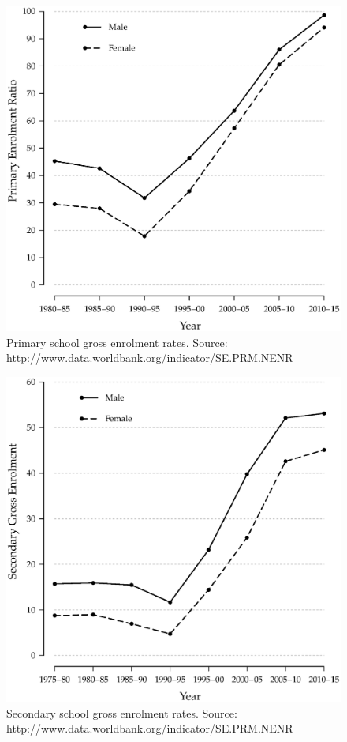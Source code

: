 \documentclass[a4paper, twocolumn]{article}
\begin{document}
\begin{figure}[!hbtp]
\includegraphics[width = \columnwidth]{../figures/fig6.eps}
\caption{Primary school gross enrolment rates. Source: http://www.data.worldbank.org/indicator/SE.PRM.NENR}\label{Fig:6}
\end{figure}


\begin{figure}[!hbtp]
\includegraphics[width = \columnwidth]{../figures/fig7.eps}
\caption{Secondary school gross enrolment rates. Source: http://www.data.worldbank.org/indicator/SE.PRM.NENR}\label{Fig:7}
\end{figure}
\end{document}
